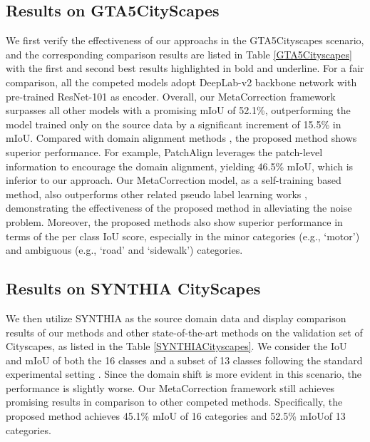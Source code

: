 \documentclass[final]{cvpr}
\begin{document}
\subsection{Results on GTA5CityScapes}
\vspace{-0.1cm}
We first verify the effectiveness of our approachs in the GTA5Cityscapes scenario, and the corresponding comparison results are listed in Table \ref{GTA5Cityscapes} with the first and second best results highlighted in bold and underline. For a fair comparison, all the competed models adopt DeepLab-v2 backbone network with pre-trained ResNet-101 as encoder. Overall, our MetaCorrection framework surpasses all other models with a promising mIoU of 52.1\%, outperforming the model trained only on the source data by a significant increment of 15.5\% in mIoU. Compared with domain alignment methods \cite{tsai2018learning, tsai2019domain, kim2020learning}, the proposed method shows superior performance. For example, PatchAlign \cite{tsai2019domain} leverages the patch-level information to encourage the domain alignment, yielding 46.5\% mIoU, which is inferior to our approach. Our MetaCorrection model, as a self-training based method, also outperforms other related pseudo label learning works \cite{zou2018unsupervised, chen2019domain, iqbal2020mlsl, lian2019constructing, pan2020unsupervised, zhang2019category}, demonstrating the effectiveness of the proposed method in alleviating the noise problem. Moreover, the proposed methods also show superior performance in terms of the per class IoU score, especially in the minor categories (e.g., `motor') and ambiguous (e.g., `road' and `sidewalk') categories. 

\subsection{Results on SYNTHIA  CityScapes}
\vspace{-0.1cm}
We then utilize SYNTHIA as the source domain data and display comparison results of our methods and other state-of-the-art methods \cite{tsai2018learning, tsai2019domain, kim2020learning, zou2018unsupervised, chen2019domain, iqbal2020mlsl, lian2019constructing, pan2020unsupervised, zhang2019category} on the validation set of Cityscapes, as listed in the Table \ref{SYNTHIACityscapes}. We consider the IoU and mIoU of both the 16 classes and a subset of 13 classes following the standard experimental setting \cite{pan2020unsupervised}. Since the domain shift is more evident in this scenario, the performance is slightly worse. Our MetaCorrection framework still achieves promising results in comparison to other competed methods. Specifically, the proposed method achieves 45.1\% mIoU of 16 categories and 52.5\% mIoUof 13 categories. 
\end{document}
